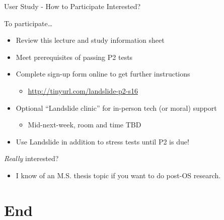 \documentclass[xcolor=dvipsnames]{beamer}
\begin{document}
\begin{frame}{User Study - How to Participate}
	Interested?
	\linegap

	To participate\dots
	\begin{itemize}
		\item Review this lecture and study information sheet
		\item Meet prerequisites of passing P2 tests
		\item Complete sign-up form online to get further instructions
			\begin{itemize}
				\item \url{http://tinyurl.com/landslide-p2-s16}
			\end{itemize}
		\item Optional ``Landslide clinic'' for in-person tech (or moral) support
			\begin{itemize}
				\item Mid-next-week, room and time TBD
			\end{itemize}
		\item Use Landslide in addition to stress tests until P2 is due!
	\end{itemize}
	\linegap

	{\em Really} interested?
	\begin{itemize}
		\item I know of an M.S. thesis topic if you want to do post-OS research.
	\end{itemize}
\end{frame}


\section{End}

\end{document}
